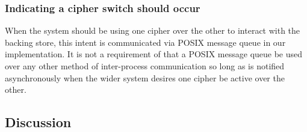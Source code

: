 \subsubsection{Indicating a cipher switch should occur}

When the system should be using one cipher over the other to interact with the
backing store, this intent is communicated via POSIX message queue in our
implementation. It is not a requirement of \SYSTEM{} that a POSIX message queue
be used over any other method of inter-process communication so long as
\SYSTEM{} is notified asynchronously when the wider system desires one cipher be
active over the other.

\subsection{Discussion}




